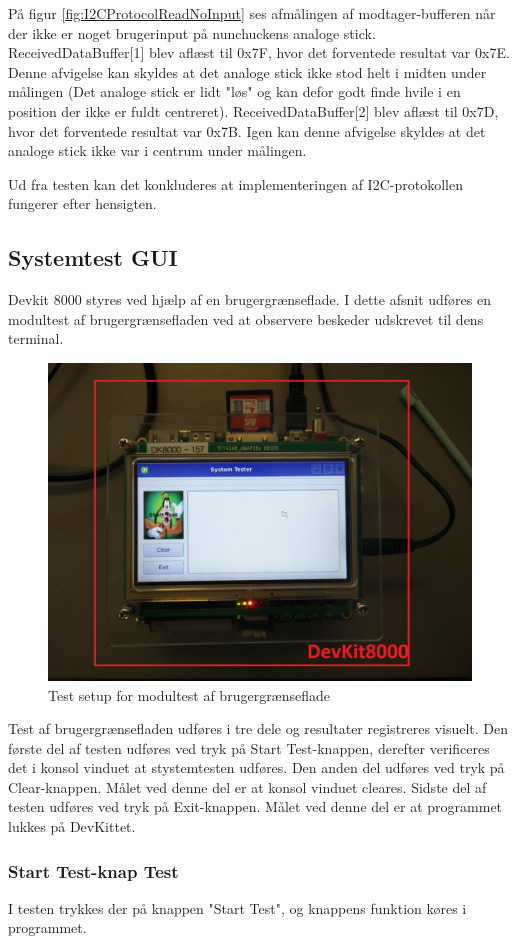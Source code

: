 \noindent På figur \ref{fig:I2CProtocolReadNoInput} ses afmålingen af modtager-bufferen når der ikke er noget brugerinput på nunchuckens analoge stick. ReceivedDataBuffer[1] blev aflæst til 0x7F, hvor det forventede resultat var 0x7E. Denne afvigelse kan skyldes at det analoge stick ikke stod helt i midten under målingen (Det analoge stick er lidt "løs" og kan defor godt finde hvile i en position der ikke er fuldt centreret). ReceivedDataBuffer[2] blev aflæst til 0x7D, hvor det forventede resultat var 0x7B. Igen kan denne afvigelse skyldes at det analoge stick ikke var i centrum under målingen. \newline

\noindent Ud fra testen kan det konkluderes at implementeringen af I2C-protokollen fungerer efter hensigten.

\subsection{Systemtest GUI}
Devkit 8000 styres ved hjælp af en brugergrænseflade. I dette afsnit udføres en modultest af brugergrænsefladen ved at observere beskeder udskrevet til dens terminal.

\begin{figure}[H]
	\centering
	\includegraphics[width=.5\textwidth]{Test/images/GUITest/TestSetup.jpg}
	\caption{Test setup for modultest af brugergrænseflade}
	\label{fig:GUISetup}
\end{figure}

\noindent Test af brugergrænsefladen udføres i tre dele og resultater registreres visuelt. Den første del af testen udføres ved tryk på Start Test-knappen, derefter verificeres det i konsol vinduet at stystemtesten udføres. Den anden del udføres ved tryk på Clear-knappen. Målet ved denne del er at konsol vinduet cleares. Sidste del af testen udføres ved tryk på Exit-knappen. Målet ved denne del er at programmet lukkes på DevKittet.


\subsubsection{Start Test-knap Test}
I testen trykkes der på knappen "Start Test", og knappens funktion køres i programmet.\newline
 
